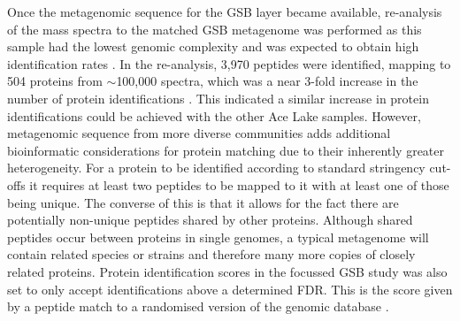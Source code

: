 Once the metagenomic sequence for the \ac{GSB} layer became available, re-analysis of the mass spectra to the matched \ac{GSB} metagenome was performed as this sample had the lowest genomic complexity and was expected to obtain high identification rates \cite{Ng2010a, Ng2010b}.
In the re-analysis, 3,970 peptides were identified, mapping to 504 proteins from $\sim$100,000 spectra, which was a near 3-fold increase in the number of protein identifications \cite{Ng2010a, Ng2010b}.
This indicated a similar increase in protein identifications could be achieved with the other Ace Lake samples.
However, metagenomic sequence from more diverse communities adds additional bioinformatic considerations for protein matching due to their inherently greater heterogeneity.
For a protein to be identified according to standard stringency cut-offs it requires at least two peptides to be mapped to it with at least one of those being unique. 
The converse of this is that it allows for the fact there are potentially non-unique peptides shared by other proteins.
Although shared peptides occur between proteins in single genomes, a typical metagenome will contain related species or strains and therefore many more copies of closely related proteins.
Protein identification scores in the focussed \ac{GSB} study was also set to only accept identifications above a determined \ac{FDR}.
This is the score given by a peptide match to a randomised version of the genomic database \cite{Ng2010a, Ng2010b}.

